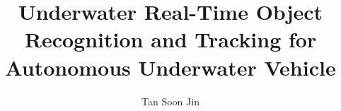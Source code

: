 \documentclass[fypca]{socreport}
\begin{document}
\title{Underwater Real-Time Object Recognition and Tracking for Autonomous Underwater Vehicle}
\author{Tan Soon Jin}

\maketitle



\listoffigures
\listoftables
\tableofcontents










{}

\end{document}
